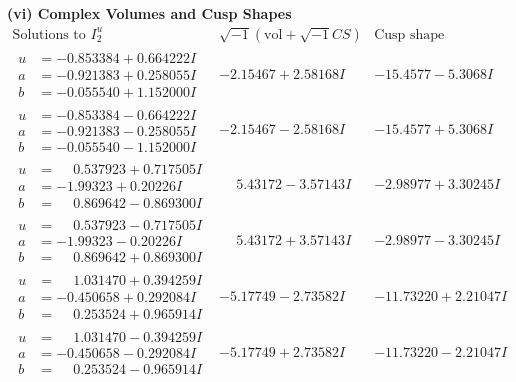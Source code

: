 \documentclass[1p]{elsarticle_modified}
\theoremstyle{definition}
\newcommand{\I}{\sqrt{-1}}
\begin{document}
\newpage\flushleft \textbf{(vi) Complex Volumes and Cusp Shapes}
$$\begin{array}{c|c|c}  
\text{Solutions to }I^u_{2}& \I (\text{vol} + \sqrt{-1}CS) & \text{Cusp shape}\\
 \hline 
\begin{aligned}
u &= -0.853384 + 0.664222 I \\
a &= -0.921383 + 0.258055 I \\
b &= -0.055540 + 1.152000 I\end{aligned}
 & -2.15467 + 2.58168 I & -15.4577 - 5.3068 I \\ \hline\begin{aligned}
u &= -0.853384 - 0.664222 I \\
a &= -0.921383 - 0.258055 I \\
b &= -0.055540 - 1.152000 I\end{aligned}
 & -2.15467 - 2.58168 I & -15.4577 + 5.3068 I \\ \hline\begin{aligned}
u &= \phantom{-}0.537923 + 0.717505 I \\
a &= -1.99323 + 0.20226 I \\
b &= \phantom{-}0.869642 - 0.869300 I\end{aligned}
 & \phantom{-}5.43172 - 3.57143 I & -2.98977 + 3.30245 I \\ \hline\begin{aligned}
u &= \phantom{-}0.537923 - 0.717505 I \\
a &= -1.99323 - 0.20226 I \\
b &= \phantom{-}0.869642 + 0.869300 I\end{aligned}
 & \phantom{-}5.43172 + 3.57143 I & -2.98977 - 3.30245 I \\ \hline\begin{aligned}
u &= \phantom{-}1.031470 + 0.394259 I \\
a &= -0.450658 + 0.292084 I \\
b &= \phantom{-}0.253524 + 0.965914 I\end{aligned}
 & -5.17749 - 2.73582 I & -11.73220 + 2.21047 I \\ \hline\begin{aligned}
u &= \phantom{-}1.031470 - 0.394259 I \\
a &= -0.450658 - 0.292084 I \\
b &= \phantom{-}0.253524 - 0.965914 I\end{aligned}
 & -5.17749 + 2.73582 I & -11.73220 - 2.21047 I \\ \hline\begin{aligned}

\end{aligned}
\end{array}$$
\end{document}
